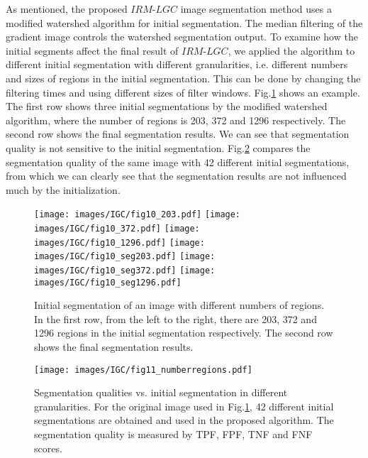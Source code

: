 As mentioned, the proposed $IRM$-$LGC$ image segmentation method
uses a modified watershed algorithm for initial segmentation. The
median filtering of the gradient image controls the watershed
segmentation output. To examine how the initial segments affect the
final result of $IRM$-$LGC$, we applied the algorithm to different
initial segmentation with different granularities, i.e. different
numbers and sizes of regions in the initial segmentation. This can
be done by changing the filtering times and using different sizes of
filter windows. Fig.\ref{fig:numregions} shows an example. The first
row shows three initial segmentations by the modified watershed
algorithm, where the number of regions is 203, 372 and 1296
respectively. The second row shows the final segmentation results.
We can see that segmentation quality is not sensitive to the initial
segmentation. Fig.\ref{fig:manyregions} compares the segmentation
quality of the same image with 42 different initial segmentations,
from which we can clearly see that the segmentation results are not
 influenced much by the initialization.

 \begin{figure}[htp]
        \centering
        {\texttt{[image: images/IGC/fig10\_203.pdf]}}
        {\texttt{[image: images/IGC/fig10\_372.pdf]}}
        {\texttt{[image: images/IGC/fig10\_1296.pdf]}}
        {\texttt{[image: images/IGC/fig10\_seg203.pdf]}}
        {\texttt{[image: images/IGC/fig10\_seg372.pdf]}}
        {\texttt{[image: images/IGC/fig10\_seg1296.pdf]}}
        \caption{
        Initial segmentation of an image with different numbers of regions.
        In the first row, from the left to the right, there are 203, 372 and
        1296 regions in the initial segmentation respectively. The second row
        shows the final segmentation results.
        }
        \label{fig:numregions}
        \end{figure}

        \begin{figure}[htp]
        \centering
        {\texttt{[image: images/IGC/fig11\_numberregions.pdf]}}
        \caption{
        Segmentation qualities vs. initial segmentation in
        different granularities. For the original image used in Fig.\ref{fig:numregions},
        42 different initial segmentations are obtained and used in the proposed
        algorithm. The segmentation quality is measured by TPF, FPF, TNF and FNF scores.
        }
        \label{fig:manyregions}
        \end{figure}

